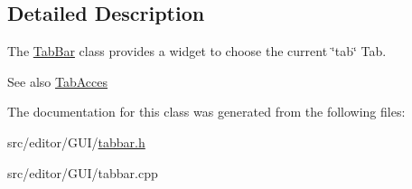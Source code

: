 \subsection{\-Detailed \-Description}
\-The \hyperlink{class_tab_bar}{\-Tab\-Bar} class provides a widget to choose the current \char`\"{}tab\char`\"{} \-Tab. 

\begin{DoxySeeAlso}{\-See also}
\hyperlink{class_tab_acces}{\-Tab\-Acces} 
\end{DoxySeeAlso}


\-The documentation for this class was generated from the following files\-:\begin{DoxyCompactItemize}
\item 
src/editor/\-G\-U\-I/\hyperlink{tabbar_8h}{tabbar.\-h}\item 
src/editor/\-G\-U\-I/tabbar.\-cpp\end{DoxyCompactItemize}

